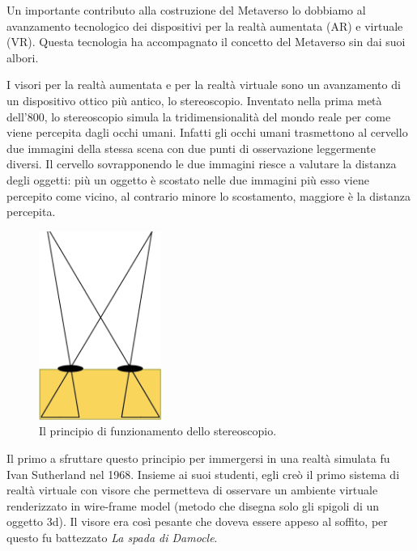         Un importante contributo alla costruzione del Metaverso lo dobbiamo al avanzamento tecnologico dei dispositivi per la realtà aumentata (AR) e virtuale (VR).
        Questa tecnologia ha accompagnato il concetto del Metaverso sin dai suoi albori.

        I visori per la realtà aumentata e per la realtà virtuale sono un avanzamento di un dispositivo ottico più antico, lo stereoscopio. 
        Inventato nella prima metà dell'800, lo stereoscopio simula la tridimensionalità del mondo reale per come viene percepita dagli occhi umani. 
        Infatti gli occhi umani trasmettono al cervello due immagini della stessa scena con due punti di osservazione leggermente diversi.
        Il cervello sovrapponendo le due immagini riesce a valutare la distanza degli oggetti: più un oggetto è scostato nelle due immagini più esso viene percepito come vicino, al contrario minore lo scostamento, maggiore è la distanza percepita. \cite{Stereoscopia}

        \begin{figure}[!ht]
            \centering
            \includegraphics[width=4cm]{figure/Stereocamera.png}
            \caption{Il principio di funzionamento dello stereoscopio.}
        \end{figure}

        Il primo a sfruttare questo principio per immergersi in una realtà simulata fu Ivan Sutherland nel 1968.
        Insieme ai suoi studenti, egli creò il primo sistema di realtà virtuale con visore che permetteva di osservare un ambiente virtuale renderizzato in wire-frame model (metodo che disegna solo gli spigoli di un oggetto 3d).
        Il visore era così pesante che doveva essere appeso al soffito, per questo fu battezzato \textit{La spada di Damocle}.

